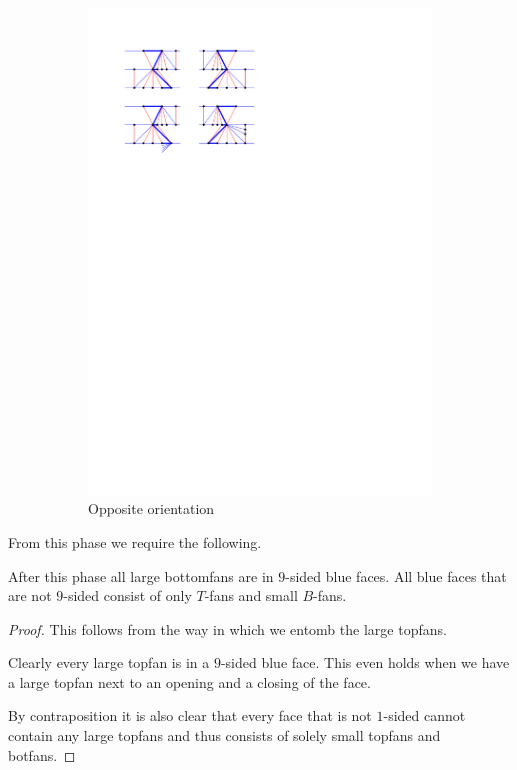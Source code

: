 \begin{figure}
\begin{subfigure}[b]{0.45 \textwidth}
        \includegraphics[width =\textwidth]{unifiedAlgo/img/post/oppChain}
        \caption{Opposite orientation}
    \end{subfigure}
    	\caption{}
\label{fig:uni:chains}
\end{figure}

From this phase we require the following.
\begin{lemma}
  \label{lm:}
  After this phase all large bottomfans are in $9$-sided blue faces. All blue faces that are not $9$-sided consist of only $T$-fans and small $B$-fans.
\end{lemma}
\begin{proof}
  This follows from the way in which we entomb the large topfans.

  Clearly every large topfan is in a $9$-sided blue face. This even holds when we have a large topfan next to an opening and a closing of the face.

   By contraposition it is also clear that every face that is not $1$-sided cannot contain any large topfans and  thus consists of solely small topfans and botfans.
\end{proof}

